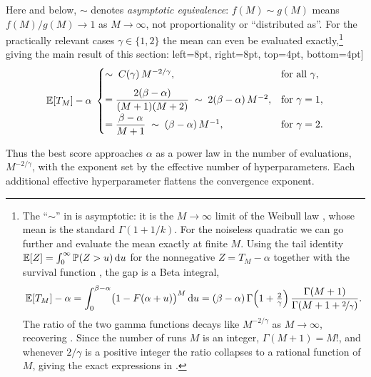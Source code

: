 Here and below, $\sim$ denotes \emph{asymptotic equivalence}: $f(M) \sim g(M)$ means $f(M)/g(M) \to 1$ as $M \to \infty$, not proportionality or ``distributed as''. For the practically relevant cases $\gamma \in \{1, 2\}$ the mean can even be evaluated exactly,\footnote{
    The ``$\sim$'' in  is asymptotic: it is the $M \to \infty$ limit of the Weibull law , whose mean is the standard $\Gamma(1 + 1/k)$. For the noiseless quadratic we can go further and evaluate the mean exactly at finite $M$. Using the tail identity $\mathbb{E}[Z] = \int_0^\infty \mathbb{P}(Z > u)\, \mathrm{d} u$ for the nonnegative $Z = T_M - \alpha$ together with the survival function , the gap is a Beta integral,
    \begin{equation}\label{eq:sample-min-exact}
        \mathbb{E}[T_M] - \alpha
        = \int_0^{\beta - \alpha} \bigl(1 - F(\alpha + u)\bigr)^M\, \mathrm{d} u
        = (\beta - \alpha)\, \Gamma\!\left(1 + \tfrac{2}{\gamma}\right) \frac{\Gamma(M + 1)}{\Gamma\!\left(M + 1 + \nicefrac{2}{\gamma}\right)}.
    \end{equation}
    The ratio of the two gamma functions decays like $M^{-2/\gamma}$ as $M \to \infty$, recovering . Since the number of runs $M$ is an integer, $\Gamma(M + 1) = M!$, and whenever $2/\gamma$ is a positive integer the ratio collapses to a rational function of $M$, giving the exact expressions in .
}
giving the main result of this section:
%
    left=8pt, right=8pt, top=4pt, bottom=4pt]
\begin{equation}\label{eq:sample-min-mean-exact}
    \mathbb{E}[T_M] - \alpha \;
    \begin{cases}
         \sim\; C(\gamma)\, M^{-2/\gamma}, & \text{for all } \gamma,\\[1.6ex]
        = \dfrac{2(\beta - \alpha)}{(M+1)(M+2)} \;\sim\; 2(\beta - \alpha)\, M^{-2}, & \text{for } \gamma = 1,\\[1.6ex]
        = \dfrac{\beta - \alpha}{M+1} \;\sim\; (\beta - \alpha)\, M^{-1}, & \text{for } \gamma = 2.
    \end{cases}
\end{equation}

Thus the best score approaches $\alpha$ as a power law in the number of evaluations, $M^{-2/\gamma}$, with the exponent set by the effective number of hyperparameters. Each additional effective hyperparameter flattens the convergence exponent.

